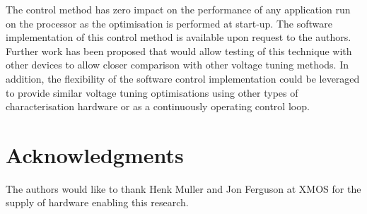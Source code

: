 \documentclass[a4paper,twocolumn,DIV=16]{scrartcl}
\begin{document}
The control method has zero impact on the performance of any application run
on the processor as the optimisation is performed at start-up. The software
implementation of this control method is available upon request to the
authors. Further work has been proposed that would allow testing of this
technique with other devices to allow closer comparison with other voltage
tuning methods. In addition, the flexibility of the software control
implementation could be leveraged to provide similar voltage tuning
optimisations using other types of characterisation hardware or as a
continuously operating control loop.

\section*{Acknowledgments}

The authors would like to thank Henk Muller and Jon Ferguson at XMOS for the
supply of hardware enabling this research.




\end{document}
